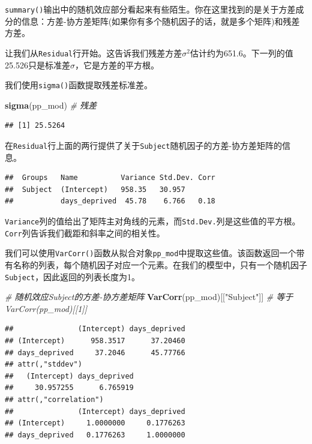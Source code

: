\documentclass[
]{book}
\newenvironment{Shaded}{\begin{snugshade}}{\end{snugshade}}
\newcommand{\CommentTok}[1]{\textcolor[rgb]{0.56,0.35,0.01}{\textit{#1}}}
\newcommand{\FunctionTok}[1]{\textcolor[rgb]{0.13,0.29,0.53}{\textbf{#1}}}
\newcommand{\NormalTok}[1]{#1}
\newcommand{\StringTok}[1]{\textcolor[rgb]{0.31,0.60,0.02}{#1}}
\begin{document}
\texttt{summary()}输出中的随机效应部分看起来有些陌生。你在这里找到的是关于方差成分的信息：方差-协方差矩阵(如果你有多个随机因子的话，就是多个矩阵)和残差方差。

让我们从\texttt{Residual}行开始。这告诉我们残差方差\(\sigma^2\)估计约为651.6。下一列的值25.526只是标准差\(\sigma\)，它是方差的平方根。

我们使用\texttt{sigma()}函数提取残差标准差。

\begin{Shaded}
\begin{Highlighting}[]
\FunctionTok{sigma}\NormalTok{(pp\_mod) }\CommentTok{\# 残差}
\end{Highlighting}
\end{Shaded}

\begin{verbatim}
## [1] 25.5264
\end{verbatim}

在\texttt{Residual}行上面的两行提供了关于\texttt{Subject}随机因子的方差-协方差矩阵的信息。

\begin{verbatim}
##  Groups   Name          Variance Std.Dev. Corr
##  Subject  (Intercept)   958.35   30.957       
##           days_deprived  45.78    6.766   0.18
\end{verbatim}

\texttt{Variance}列的值给出了矩阵主对角线的元素，而\texttt{Std.Dev.}列是这些值的平方根。\texttt{Corr}列告诉我们截距和斜率之间的相关性。

我们可以使用\texttt{VarCorr()}函数从拟合对象\texttt{pp\_mod}中提取这些值。该函数返回一个带有名称的列表，每个随机因子对应一个元素。在我们的模型中，只有一个随机因子\texttt{Subject}，因此返回的列表长度为1。

\begin{Shaded}
\begin{Highlighting}[]
\CommentTok{\# 随机效应Subject的方差{-}协方差矩阵}
\FunctionTok{VarCorr}\NormalTok{(pp\_mod)[[}\StringTok{"Subject"}\NormalTok{]] }\CommentTok{\# 等于VarCorr(pp\_mod)[[1]]}
\end{Highlighting}
\end{Shaded}

\begin{verbatim}
##               (Intercept) days_deprived
## (Intercept)      958.3517      37.20460
## days_deprived     37.2046      45.77766
## attr(,"stddev")
##   (Intercept) days_deprived 
##     30.957255      6.765919 
## attr(,"correlation")
##               (Intercept) days_deprived
## (Intercept)     1.0000000     0.1776263
## days_deprived   0.1776263     1.0000000
\end{verbatim}
\end{document}
